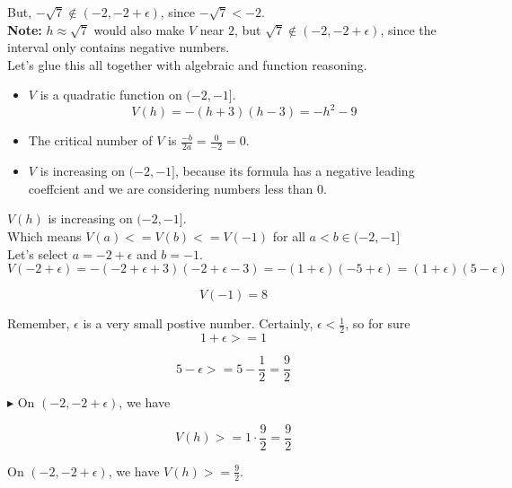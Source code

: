 \documentclass{ximera}
\begin{document}
\begin{explanation}
\begin{itemize}
But, $-\sqrt{7} \notin (-2, -2 + \epsilon)$, since $-\sqrt{7} < -2$.  \\

\textbf{Note:} $h \approx \sqrt{7}$ would also make $V$ near $2$, but $\sqrt{7} \notin (-2, -2 + \epsilon)$, since the interval only contains negative numbers.\\

Let's glue this all together with algebraic and function reasoning. \\





\begin{itemize}
  \item $V$ is a quadratic function on $(-2, -1]$. 
  \[
V(h) = -(h + 3)(h - 3) = -h^2 -9
  \]
  \item The critical number of $V$ is $\frac{-b}{2a} = \frac{0}{-2} = 0$.
  \item $V$ is increasing on $(-2, -1]$, because its formula has a negative leading coeffcient and we are considering numbers less than $0$.
\end{itemize}

$V(h)$ is increasing on $(-2, -1]$. \\
Which means $V(a) <= V(b) <= V(-1)$ for all $a < b \in (-2, -1]$ \\

Let's select $a = -2 + \epsilon$ and $b = -1$. \\

\[
V(-2 + \epsilon) = -(-2 + \epsilon + 3) (-2 + \epsilon - 3) = -(1 + \epsilon) (-5 + \epsilon) = (1 + \epsilon) (5 - \epsilon)
\]

\[
V(-1) = 8
\]


Remember, $\epsilon$ is a very small postive number.  Certainly, $\epsilon < \frac{1}{2}$, so for sure  \\


\[
1 + \epsilon >= 1
\]

\[
5 -  \epsilon >= 5 -  \frac{1}{2} = \frac{9}{2}
\]




\textbf{\textcolor{blue!55!black}{$\blacktriangleright$}} On $(-2, -2 + \epsilon)$, we have


\[
V(h) >= 1 \cdot \frac{9}{2} = \frac{9}{2}
\]



On $(-2, -2 + \epsilon)$, we have $V(h) >=  \frac{9}{2}$.





\end{itemize}
\end{explanation}
\end{document}
